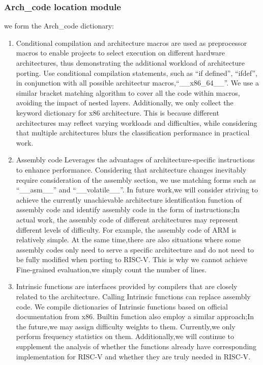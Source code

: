 \documentclass[sigconf,screen,review,anonymous]{acmart}
\begin{document}
\subsubsection{Arch\_code location module}
we form the Arch\_code dictionary:
\begin{enumerate}
  \item Conditional compilation and architecture macros are used as preprocessor macros to enable projects to select execution on different hardware architectures, thus demonstrating the additional workload of architecture porting.
  Use conditional compilation statements, such as ``if defined'', ``ifdef'', in conjunction with all possible architectur macros,``\_\_x86\_64\_\_''.
  We use a similar bracket matching algorithm to cover all the code within macros, avoiding the impact of nested layers.
  Additionally, we only collect the keyword dictionary for x86 architecture.
  This is because different architectures may reflect varying workloads and difficulties, while considering that multiple architectures blurs the classification performance in practical work.
  \item Assembly code Leverages the advantages of architecture-specific instructions to enhance performance.
  Considering that architecture changes inevitably require consideration of the assembly section, we use matching forms such as ``\_\_asm\_\_'' and ``\_\_volatile\_\_''.
  In future work,we will consider striving to achieve the currently unachievable architecture identification function of assembly code and identify assembly code in the form of instructions;In actual work, the assembly code of different architectures may represent different levels of difficulty.
  For example, the assembly code of ARM is relatively simple.
  At the same time,there are also situations where some assembly codes only need to serve a specific architecture and do not need to be fully modified when porting to RISC-V.
  This is why we cannot achieve Fine-grained evaluation,we simply count the number of lines.
  \item Intrinsic functions are interfaces provided by compilers that are closely related to the architecture.
  Calling Intrinsic functions can replace assembly code.
  We compile dictionaries of Intrinsic functions based on official documentation from x86.
  Builtin function also employ a similar approach;In the future,we may assign difficulty weights to them.
  Currently,we only perform frequency statistics on them.
  Additionally,we will continue to supplement the analysis of whether the functions already have corresponding implementation for RISC-V and whether they are truly needed in RISC-V.

\end{enumerate}
\end{document}

